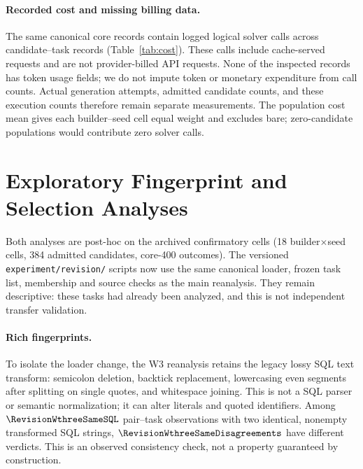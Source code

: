 \begin{table}[t]
\centering\small

\caption{Corrected sensitivities on core-400, 18 cells. CIs are unadjusted.
K-matched comparisons always retain bare; R2 comparisons exclude bare and
are conditional on the observed acquisition groups.}
\label{tab:sensitivity}
\end{table}

\paragraph{Recorded cost and missing billing data.}
The same canonical core records contain \RevisionLogicalCalls{} logged
logical solver calls across \RevisionCostRows{} candidate--task records
(Table~\ref{tab:cost}). These calls include cache-served requests and are
not provider-billed API requests. None of the inspected records has token
usage fields; we do not impute token or monetary expenditure from call
counts. Actual generation attempts, admitted candidate counts, and these
execution counts therefore remain separate measurements. The population
cost mean gives each builder--seed cell equal weight and excludes bare;
zero-candidate populations would contribute zero solver calls.

\begin{table}[t]
\centering\small

\caption{Descriptive canonical cost audit on core-400, 18 cells per arm.
Logged logical calls are not billable requests or token counts. The last
column averages candidate-population calls per task over cells.}
\label{tab:cost}
\end{table}

\section{Exploratory Fingerprint and Selection Analyses}\label{app:rich}
Both analyses are post-hoc on the archived confirmatory cells (18
builder$\times$seed cells, 384 admitted candidates, core-400 outcomes).
The versioned \texttt{experiment/revision/} scripts now use the same
canonical loader, frozen task list, membership and source checks as the
main reanalysis. They remain descriptive: these tasks had already been
analyzed, and this is not independent transfer validation.

\paragraph{Rich fingerprints.} To isolate the loader change, the W3
reanalysis retains the legacy lossy SQL text transform: semicolon deletion,
backtick replacement, lowercasing even segments after splitting on single
quotes, and whitespace joining. This is not a SQL parser or semantic
normalization; it can alter literals and quoted identifiers. Among
$\RevisionWthreeSameSQL$ pair--task observations with two identical,
nonempty transformed SQL strings, $\RevisionWthreeSameDisagreements$
have different verdicts. This is an observed consistency check, not a
property guaranteed by construction.

